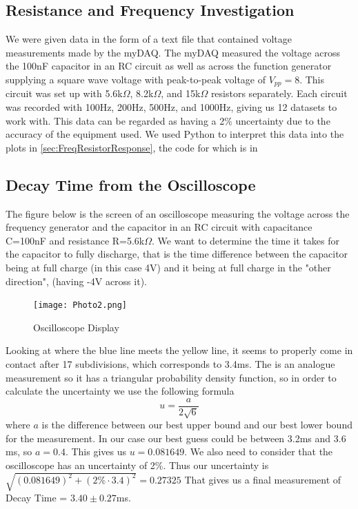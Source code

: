 \documentclass[12pt]{article}
\numberwithin{equation}{section}
\numberwithin{figure}{section}
\begin{document}
    \subsection{Resistance and Frequency Investigation}
    We were given data in the form of a text file that contained voltage measurements made by the myDAQ. 
    The myDAQ measured the voltage across the 100nF capacitor in an RC circuit as well as across the 
    function generator supplying a square wave voltage with peak-to-peak voltage of $V_{pp}=8$. This circuit 
    was set up with 5.6k$\Omega$, 8.2k$\Omega$, and 15k$\Omega$ resistors separately. Each circuit was 
    recorded with 100Hz, 200Hz, 500Hz, and 1000Hz, giving us 12 datasets to work with. This data can be 
    regarded as having a 2\% uncertainty due to the accuracy of the equipment used. We used Python to 
    interpret this data into the plots in \autoref{sec:FreqResistorResponse}, the code for which is in

    \subsection{Decay Time from the Oscilloscope}
    The figure below is the screen of an oscilloscope measuring the voltage across the frequency generator 
    and the capacitor in an RC circuit with capacitance C=100nF and resistance R=5.6k$\Omega$. We want to 
    determine the time it takes for the capacitor to fully discharge, that is the time difference between 
    the capacitor being at full charge (in this case 4V) and it being at full charge in the "other direction", 
    (having -4V across it).
    \begin{figure}[H]
        \begin{center}
           \texttt{[image: Photo2.png]}
           \caption{Oscilloscope Display}
           \label{fig:DecayTimeScreen}
        \end{center}
    \end{figure}
    Looking at where the blue line meets the yellow line, it seems to properly come in contact after 17 
    subdivisions, which corresponds to 3.4ms. The is an analogue measurement so it has a triangular 
    probability density function, so in order to calculate the uncertainty we use the following formula
    \begin{equation}
        u=\frac{a}{2\sqrt{6}}
    \end{equation}
    where $a$ is the difference between our best upper bound and our best lower bound for the measurement. 
    In our case our best guess could be between 3.2ms and 3.6 ms, so $a=0.4$. This gives us $u=0.081649$. 
    We also need to consider that the oscilloscope has an uncertainty of 2\%. Thus our uncertainty is 
    $\sqrt{(0.081649)^2+(2\%\cdot 3.4)^2}=0.27325$
    That gives us a final measurement of Decay Time = $3.40\pm 0.27$ms. 
\end{document}

